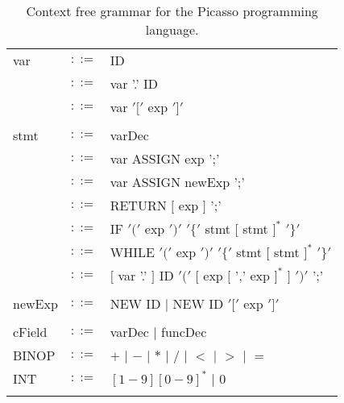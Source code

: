\documentclass{article}
\begin{document}
\begin{table}[h]
\begin{tabular}{ l c l }
var      & $::=$ & ID                  \\
         & $::=$ & var '.' ID          \\
         & $::=$ & var $'['$ exp $']'$ \\
\\  
stmt     & $::=$ & varDec                                                             \\
         & $::=$ & var ASSIGN exp ';'                                                 \\
         & $::=$ & var ASSIGN newExp ';'                                              \\
         & $::=$ & RETURN $[$ exp $]$ ';'                                             \\
         & $::=$ & IF $'('$ exp $')'$ $'\{'$ stmt $[$ stmt $]^{*}$ $'\}'$             \\
         & $::=$ & WHILE $'('$ exp $')'$ $'\{'$ stmt $[$ stmt $]^{*}$ $'\}'$          \\
         & $::=$ & $[$ var '.' $]$ ID $'('$ $[$ exp $[$ ',' exp $]^{*}$ $]$ $')'$ ';' \\
\\
newExp   & $::=$ & NEW ID $|$ NEW ID $'['$ exp $']'$ \\
\\
cField   & $::=$ & varDec $|$ funcDec \\
BINOP    & $::=$ & $+$ $|$ $-$ $|$ $*$ $|$ $/$ $|$ $<$ $|$ $>$ $|$ $=$ \\
INT      & $::=$ & $[1-9][0-9]^{*}$ $|$ $0$                            \\
\\
\end{tabular}
\caption{
Context free grammar for the Picasso programming language.
\label{Table_CFG_Of_Picasso}}
\end{table}
\end{document}
